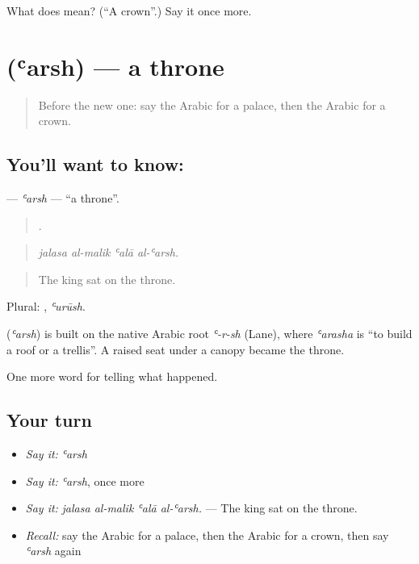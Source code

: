 \begin{tcolorbox}[breakable,colback=teal!4,colframe=teal!35!black,title={Before you move on}]
What does  mean? (\textquotedblleft{}A crown\textquotedblright{}.) Say it once more.
\end{tcolorbox}
\section[\texorpdfstring{\ar{عرش} (ʿarsh)}{عرش (ʿarsh)}]{ (ʿarsh) — a throne}

\label{lesson:AR-C309-arsh}



\begin{quote}
Before the new one: say the Arabic for a palace, then the Arabic for a crown.
\end{quote}

\subsection*{You'll want to know: }
\textbf{} — \emph{ʿarsh} — \textquotedblleft{}a throne\textquotedblright{}.

\begin{quote}
   .
\end{quote}

\begin{quote}
\emph{jalasa al-malik ʿalā al-ʿarsh.}
\end{quote}

\begin{quote}
The king sat on the throne.
\end{quote}

Plural: , \emph{ʿurūsh}.

\begin{cousinweb}
\textbf{} (\emph{ʿarsh}) is built on the native Arabic root \emph{ʿ-r-sh} (Lane), where \emph{ʿarasha} is \textquotedblleft{}to build a roof or a trellis\textquotedblright{}. A raised seat under a canopy became the throne.
\end{cousinweb}

\begin{grammarlens}[title={What you've built}]
One more word for telling what happened.
\end{grammarlens}

\subsection*{Your turn}
\begin{itemize}
\raggedright
  \item \emph{Say it:} \emph{ʿarsh}
  \item \emph{Say it:} \emph{ʿarsh}, once more
  \item \emph{Say it:} \emph{jalasa al-malik ʿalā al-ʿarsh.} — The king sat on the throne.
  \item \emph{Recall:} say the Arabic for a palace, then the Arabic for a crown, then say \emph{ʿarsh} again
\end{itemize}

